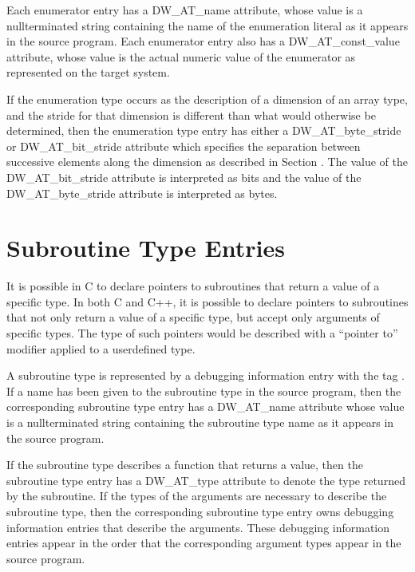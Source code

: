 Each enumerator entry has a DW\_AT\_name attribute, whose
value is a null\dash terminated string containing the name of the
enumeration literal as it appears in the source program. Each
enumerator entry also has a DW\_AT\_const\_value attribute,
whose value is the actual numeric value of the enumerator as
represented on the target system.


If the enumeration type occurs as the description of a
dimension of an array type, and the stride for that dimension
is different than what would otherwise be determined, then
the enumeration type entry has either a DW\_AT\_byte\_stride
or DW\_AT\_bit\_stride attribute which specifies the separation
between successive elements along the dimension as described
in 
Section . 
The value of the DW\_AT\_bit\_stride attribute
is interpreted as bits and the value of the DW\_AT\_byte\_stride
attribute is interpreted as bytes.


\section{Subroutine Type Entries}
\label{chap:subroutinetypeentries}

It is possible in C to declare pointers to subroutines
that return a value of a specific type. In both C and C++,
it is possible to declare pointers to subroutines that not
only return a value of a specific type, but accept only
arguments of specific types. The type of such pointers would
be described with a ``pointer to'' modifier applied to a
user\dash defined type.

A subroutine type is represented by a debugging information
entry with the 
tag . 
If a name has
been given to the subroutine type in the source program,
then the corresponding subroutine type entry has a DW\_AT\_name
attribute whose value is a null\dash terminated string containing
the subroutine type name as it appears in the source program.

If the subroutine type describes a function that returns
a value, then the subroutine type entry has a DW\_AT\_type
attribute to denote the type returned by the subroutine. If
the types of the arguments are necessary to describe the
subroutine type, then the corresponding subroutine type
entry owns debugging information entries that describe the
arguments. These debugging information entries appear in the
order that the corresponding argument types appear in the
source program.

